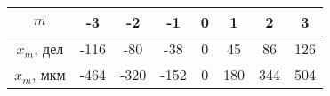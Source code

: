 \begin{tabular}{|c|c|c|c|c|c|c|c|}
\hline
$m$&-3&-2&-1&0&1&2&3\\
\hline
$x_m$, дел&-116&-80&-38&0&45&86&126\\
\hline
$x_m$, мкм&-464&-320&-152&0&180&344&504\\
\hline
\end{tabular}